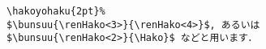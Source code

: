 \begin{verbatim}
\hakoyohaku{2pt}%
$\bunsuu{\renHako<3>}{\renHako<4>}$, あるいは 
$\bunsuu{\renHako<2>}{\Hako}$ などと用います．
\end{verbatim}
